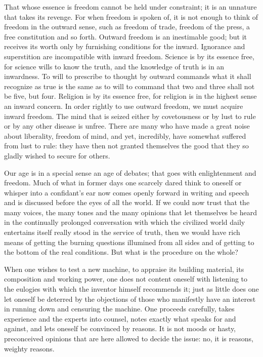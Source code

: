 \documentclass[12pt,a4paper,openany]{book}
\newcommand{\opage}[1]{\marginnote{\footnotesize\textit{[#1]}}}
\begin{document}
That whose essence is freedom cannot be held under
\setcounter{footnote}{0}%
\opage{58}constraint; it is an unnature that takes its revenge. For when
freedom is spoken of, it is not enough to think
of freedom in the outward sense, such as freedom of trade,
freedom of the press, a free constitution and so forth. Outward
freedom is an inestimable good; but it
receives its worth only by furnishing conditions for the
inward. Ignorance and superstition are incompatible with
inward freedom. Science is by its essence free,
for science wills to know the truth, and the knowledge of truth
is in an inwardness. To will to prescribe to thought by outward
commands what it shall recognize
as true is the same as to will to command that two and
three shall not be five, but four. Religion is
by its essence free, for religion is in the highest sense
an inward concern. In order rightly to use
outward freedom, we must acquire inward freedom.
The mind that is seized either by covetousness or by
lust to rule or by any other disease
is unfree. There are many who have made a great noise about
liberality, freedom of mind, and yet, incredibly, have somewhat suffered from
lust to rule: they have then not granted themselves the good
that they so gladly wished to secure for others.

Our age is in a special sense an age of debates;
that goes with enlightenment and freedom. Much of
what in former days one scarcely dared think to oneself
or whisper into a confidant's ear now comes openly
forward in writing and speech and is discussed before the eyes of all the world.
If we could now trust that the many voices,
the many tones and the many opinions that let themselves
be heard in the continually prolonged conversation with which the
civilized world daily entertains itself really
stood in the service of truth, then we would have rich
\setcounter{footnote}{0}%
\opage{59}means of getting the burning questions illumined
from all sides and of getting to the bottom of the real conditions.
But what is the procedure on the whole?

When one wishes to test a new machine, to appraise its
building material, its composition and working power,
one does not content oneself with listening to the eulogies with which
the inventor himself recommends it; just as little does one
let oneself be deterred by the objections of those who manifestly
have an interest in running down and censuring the machine. One
proceeds carefully, takes experience and the experts
into counsel, notes exactly what speaks for
and against, and lets oneself be convinced by reasons. It is
not moods or hasty, preconceived opinions
that are here allowed to decide the issue: no,
it is reasons, weighty reasons.
\end{document}
